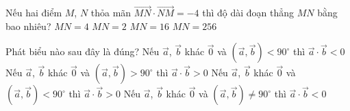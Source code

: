 \begin{ex}%
	Nếu hai điểm $M$, $N$ thỏa mãn $\overrightarrow{MN}\cdot \overrightarrow{NM}=-4$ thì độ dài đoạn thẳng $MN$ bằng bao nhiêu?
	\choice
	{$MN=4$}
	{\True $MN=2$}
	{$MN=16$}
	{$MN=256$}
\end{ex}
\begin{ex}%
	Phát biểu nào sau đây là đúng?
	\choice
	{Nếu $\overrightarrow{a}$, $\overrightarrow{b}$ khác $\overrightarrow{0}$ và $\left(\overrightarrow{a}, \overrightarrow{b}\right)<90^\circ$ thì $\overrightarrow{a}\cdot\overrightarrow{b}<0$}
	{Nếu $\overrightarrow{a}$, $\overrightarrow{b}$ khác $\overrightarrow{0}$ và $\left(\overrightarrow{a}, \overrightarrow{b}\right)>90^\circ$ thì $\overrightarrow{a}\cdot\overrightarrow{b}>0$}
	{\True Nếu $\overrightarrow{a}$, $\overrightarrow{b}$ khác $\overrightarrow{0}$ và $\left(\overrightarrow{a}, \overrightarrow{b}\right)<90^\circ$ thì $\overrightarrow{a}\cdot\overrightarrow{b}>0$}
	{Nếu $\overrightarrow{a}$, $\overrightarrow{b}$ khác $\overrightarrow{0}$ và $\left(\overrightarrow{a}, \overrightarrow{b}\right)\neq90^\circ$ thì $\overrightarrow{a}\cdot\overrightarrow{b}<0$}
\end{ex}

